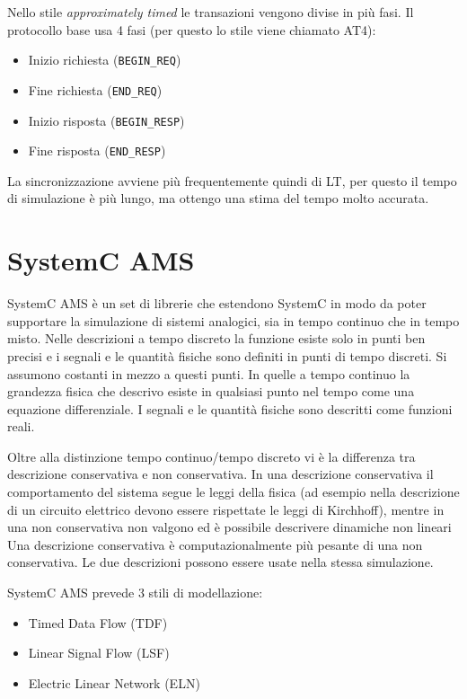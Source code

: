 \documentclass[10pt,a4paper,oneside]{scrbook}
\begin{document}
Nello stile \textit{approximately timed} le transazioni vengono divise in più fasi. Il protocollo base usa 4 fasi (per questo lo stile viene chiamato AT4):
\begin{itemize}
    \item Inizio richiesta (\texttt{BEGIN\_REQ})
    \item Fine richiesta (\texttt{END\_REQ})
    \item Inizio risposta (\texttt{BEGIN\_RESP})
    \item Fine risposta (\texttt{END\_RESP})
\end{itemize}
La sincronizzazione avviene più frequentemente quindi di LT, per questo il tempo di simulazione è più lungo, ma ottengo una stima del tempo molto accurata.


\section{SystemC AMS}
SystemC AMS è un set di librerie che estendono SystemC in modo da poter supportare la simulazione di sistemi analogici, sia in tempo continuo che in tempo misto.
Nelle descrizioni a tempo discreto la funzione esiste solo in punti ben precisi e i segnali e le quantità fisiche sono definiti in punti di tempo discreti. 
Si assumono costanti in mezzo a questi punti.
In quelle a tempo continuo la grandezza fisica che descrivo esiste in qualsiasi punto nel tempo come una equazione differenziale. I segnali e le
quantità fisiche sono descritti come funzioni reali.

Oltre alla distinzione tempo continuo/tempo discreto vi è la differenza tra descrizione conservativa e non conservativa.
In una descrizione conservativa il comportamento del sistema segue le leggi della fisica (ad esempio nella descrizione
di un circuito elettrico devono essere rispettate le leggi di Kirchhoff), mentre in una non conservativa
non valgono ed è possibile descrivere dinamiche non lineari
Una descrizione conservativa è computazionalmente più pesante di una non conservativa.
Le due descrizioni possono essere usate nella stessa simulazione.

SystemC AMS prevede 3 stili di modellazione:
\begin{itemize}
    \item Timed Data Flow (TDF)
    \item Linear Signal Flow (LSF)
    \item Electric Linear Network (ELN)
\end{itemize}
\end{document}
